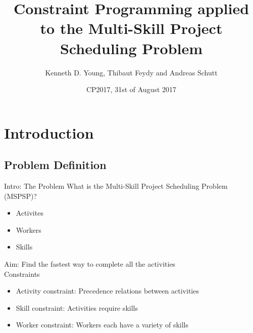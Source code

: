 \documentclass{beamer}
\title[CP applied to the MSPSP]{Constraint Programming applied to the Multi-Skill Project Scheduling Problem}
\author{Kenneth D. Young, Thibaut Feydy and Andreas Schutt}
\date{CP2017, 31st of August 2017}
\begin{document}
\maketitle

\section{Introduction}
\subsection{Problem Definition}
\begin{frame}{Intro: The Problem}
	What is the Multi-Skill Project Scheduling Problem (MSPSP)?\pause
	\begin{itemize}
		\item Activites
		\item Workers
		\item Skills\pause
	\end{itemize}
	\vspace{4mm}
	\alert{Aim:} Find the fastest way to complete all the activities\pause\\
	\vspace{4mm}
	Constraints
	\begin{itemize}
		\item Activity constraint: Precedence relations between activities
		\item Skill constraint: Activities require skills
		\item Worker constraint: Workers each have a variety of skills
	\end{itemize}
\end{frame}
\end{document}
